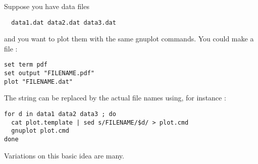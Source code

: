 Suppose you have data files
\begin{verbatim}
  data1.dat data2.dat data3.dat
\end{verbatim}
and you want to plot them with the same gnuplot commands. You could
make a file :
\begin{verbatim}
set term pdf
set output "FILENAME.pdf"
plot "FILENAME.dat"
\end{verbatim}
The string  can be replaced by the actual file names
using, for instance :
\begin{verbatim}
for d in data1 data2 data3 ; do
  cat plot.template | sed s/FILENAME/$d/ > plot.cmd
  gnuplot plot.cmd
done
\end{verbatim}
Variations on this basic idea are many.
